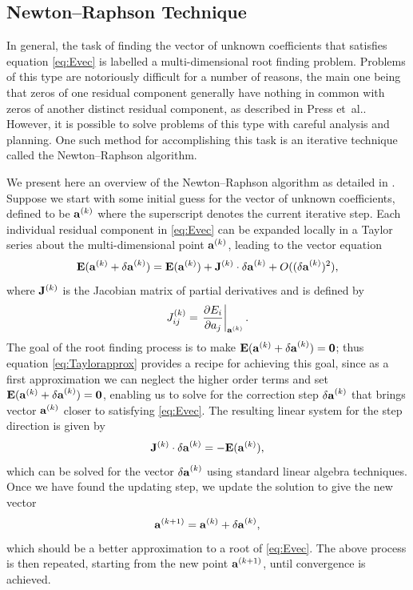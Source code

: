\subsection{Newton--Raphson Technique} \label{sec:NewRap} 
In general, the task of finding the vector of unknown coefficients  that satisfies equation \eqref{eq:Evec} is labelled a multi-dimensional root finding problem. Problems of this type are notoriously difficult for a number of reasons, the main one being that zeros of one residual component generally have nothing in common with zeros of another distinct residual component, as described in Press et~al.\cite[pages 383--386]{Press:NRC}. However, it is possible to solve problems of this type with careful analysis and planning. One such method for accomplishing this task is an iterative technique called the Newton--Raphson algorithm.

We present here an overview of the Newton--Raphson algorithm as detailed in \cite[pages 383--386]{Press:NRC}. Suppose we start with some initial guess for the vector of unknown coefficients, defined to be $\mathbf{a}^{(k)}$ where the superscript denotes the current iterative step. Each individual residual component in \eqref{eq:Evec} can be expanded locally in a Taylor series about the multi-dimensional point $\mathbf{a}^{(k)}$, leading to the vector equation
\begin{equation}
\mathbf{E}(\mathbf{a}^{(k)}+\mathbf{\delta a}^{(k)})=\mathbf{E}(\mathbf{a}^{(k)})+\mathbf{J}^{(k)}\cdot\mathbf{\delta a}^{(k)}+O((\mathbf{\delta a}^{(k)})^2), \label{eq:Taylorapprox}
\end{equation}
where $\mathbf{J}^{(k)}$ is the Jacobian matrix of partial derivatives and is defined by
\begin{equation}
J^{(k)}_{ij} =\left. \frac{\partial E_i}{\partial a_j} \right|_{\mathbf{a}^{(k)}}.
\end{equation}
The goal of the root finding process is to make $\mathbf{E}(\mathbf{a}^{(k)}+\mathbf{\delta a}^{(k)})=\mathbf{0}$; thus equation \eqref{eq:Taylorapprox} provides a recipe for achieving this goal, since as a first approximation we can neglect the higher order terms and set $\mathbf{E}(\mathbf{a}^{(k)}+\mathbf{\delta a}^{(k)})=\mathbf{0}$, enabling us to solve for the correction step $\mathbf{\delta a}^{(k)}$ that brings vector $\mathbf{a}^{(k)}$ closer to satisfying \eqref{eq:Evec}. The resulting linear system for the step direction is given by
\begin{equation}
\mathbf{J}^{(k)}\cdot\mathbf{\delta a}^{(k)} = -\mathbf{E}(\mathbf{a}^{(k)}),
\end{equation}
which can be solved for the vector $\mathbf{\delta a}^{(k)}$ using standard linear algebra techniques. Once we have found the updating step, we update the solution to give the new vector
\begin{equation}
\mathbf{a}^{(k+1)}=\mathbf{a}^{(k)}+ \mathbf{\delta a}^{(k)},
\end{equation}
which should be a better approximation to a root of \eqref{eq:Evec}. The above process is then repeated, starting from the new point $\mathbf{a}^{(k+1)}$, until convergence is achieved.

